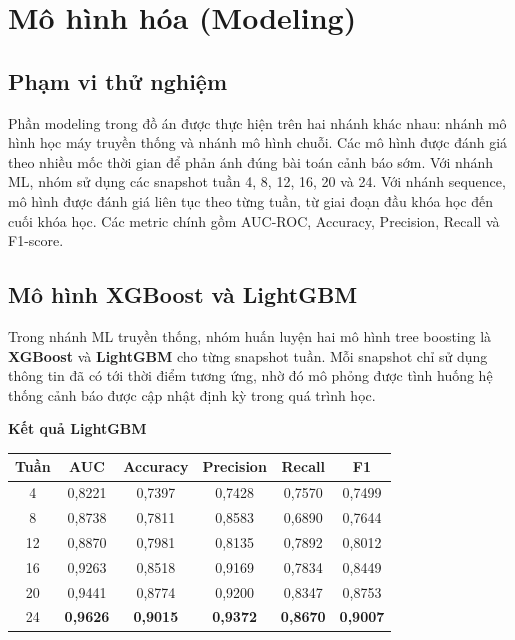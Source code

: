 \section{Mô hình hóa (Modeling)}

\subsection{Phạm vi thử nghiệm}

Phần modeling trong đồ án được thực hiện trên hai nhánh khác nhau: nhánh mô hình học máy truyền thống và nhánh
mô hình chuỗi. Các mô hình được đánh giá theo nhiều mốc thời gian để phản ánh đúng bài toán cảnh báo sớm.
Với nhánh ML, nhóm sử dụng các snapshot tuần 4, 8, 12, 16, 20 và 24. Với nhánh sequence,
mô hình được đánh giá liên tục theo từng tuần, từ giai đoạn đầu khóa học đến cuối khóa học.
Các metric chính gồm AUC-ROC, Accuracy, Precision, Recall và F1-score.

\subsection{Mô hình XGBoost và LightGBM}

Trong nhánh ML truyền thống, nhóm huấn luyện hai mô hình
tree boosting là \textbf{XGBoost} và \textbf{LightGBM} cho từng snapshot tuần. Mỗi snapshot
chỉ sử dụng thông tin đã có tới thời điểm tương ứng, nhờ đó mô phỏng được tình huống hệ
thống cảnh báo được cập nhật định kỳ trong quá trình học.

\begin{center}
\small
\textbf{Kết quả LightGBM}

\renewcommand{\arraystretch}{1.3}
\begin{tabular}{|c|c|c|c|c|c|}
\hline
\textbf{Tuần} & \textbf{AUC} & \textbf{Accuracy} & \textbf{Precision} & \textbf{Recall} & \textbf{F1} \\
\hline
4  & 0,8221 & 0,7397 & 0,7428 & 0,7570 & 0,7499 \\
8  & 0,8738 & 0,7811 & 0,8583 & 0,6890 & 0,7644 \\
12 & 0,8870 & 0,7981 & 0,8135 & 0,7892 & 0,8012 \\
16 & 0,9263 & 0,8518 & 0,9169 & 0,7834 & 0,8449 \\
20 & 0,9441 & 0,8774 & 0,9200 & 0,8347 & 0,8753 \\
24 & \textbf{0,9626} & \textbf{0,9015} & \textbf{0,9372} & \textbf{0,8670} & \textbf{0,9007} \\
\hline
\end{tabular}
\end{center}

